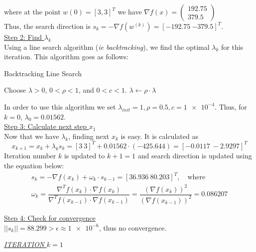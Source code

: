 where at the point $w\left(0\right) = \left[3, 3\right]^T$ we have $\nabla f(x) = \left(\begin{array}{c}
	192.75 \\
	379.5
\end{array}\right)$\\
Thus, the search direction is $s_k = -\nabla f\left( w^{(k)}\right) = [\num{-192.75} \ \num{-379.5}]^T$.\\

\underline{Step 2: Find $\lambda_k$}\\
Using a line search algorithm (\textit{ie backtracking}), we find the optimal $\lambda_k$ for this iteration. This algorithm goes as follows:
\begin{algorithm}[H]
	\caption{Backtracking Line Search}
	\begin{algorithmic}
		\State Choose $\lambda > 0$, $0 < \rho < 1$, and $0 < c < 1$.
		\State $\lambda \gets \rho \cdot \lambda$
		\EndWhile
	\end{algorithmic}
\end{algorithm}
In order to use this algorithm we set $\lambda_{init} = 1, \rho=0.5, c=\num{1e-4}$.
Thus, for $k=0$, $\lambda_0 = 0.01562$.\\

\underline{Step 3: Calculate next step $x_{1}$}\\
Now that we have $\lambda_k$, finding next $x_k$ is easy. It is calculated as
\[
x_{k+1} = x_k + \lambda_k s_k = [3\ 3]^T + 0.01562 \cdot (-425.644) = [-0.0117\  -2.9297]^T
\]
Iteration number $k$ is updated to $k+1=1$ and search direction is updated using the equation below:
\[
\begin{gathered}
	s_{k} = - \nabla f(x_k) + \omega_k \cdot s_{k-1} = [36.936 \ 80.203]^T, \quad \text{where} \\ 
	\omega_k = \dfrac{\nabla^T f(x_k) \cdot \nabla f(x_k)}{\nabla^T f(x_{k-1}) \cdot \nabla f(x_{k-1})} = \dfrac{\left( \nabla f(x_k) \right)^2}{\left( \nabla f(x_{k-1}) \right)^2} =  0.086207
\end{gathered}
\]

\underline{Step 4: Check for convergence}\\[2mm]
$||s_k|| =  88.299 > \epsilon \approx \num{1e-6}$, thus no convergence.\\[3mm]

\begin{center}
	\underline{\textit{ITERATION} $k=1$}
\end{center}

